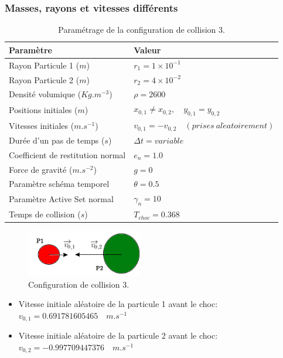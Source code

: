 \subsubsection{Masses, rayons et vitesses différents}
\begin{center}
\begin{table}[!h]
\begin{tabular}{ |p{5.75cm}|p{6.8cm}| }
 \hline \rowcolor{lightgray}
 \hline
 Paramètre& Valeur\\
 \hline
 Rayon Particule 1  ($m$) & $r_1 = 1\times10^{-1}$\\
 Rayon Particule 2 ($m$)  & $r_2 = 4\times10^{-2}$\\
 Densité volumique ($Kg.m^{-3}$)& $\rho = 2600$\\
 Positions initiales ($m$) & $x_{0,1} \neq x_{0,2}, \quad y_{0,1} = y_{0,2}$\\
 Vitesses initiales  ($m.s^{-1}$)  &$v_{0,1} = -v_{0,2} \quad (prises\ al\acute{e}atoirement)$\\
 Durée d'un pas de temps ($s$)&   $\Delta t = variable$\\
 Coefficient de restitution normal& $e_n = 1.0$\\
 Force de gravité ($m.s^{-2}$)& $g = 0$\\
 Paramètre schéma temporel & $\theta = 0.5$\\
 Paramètre Active Set normal &$\gamma_n = 10$\\
 Temps de collision ($s$)& $T_{choc} = 0.368$\\
 \hline
\end{tabular}
\caption{Paramétrage de la configuration de collision 3.}
\end{table}
\end{center}
\vspace{-1.2cm}
\begin{figure}[!h]
  \centering
    \includegraphics[width=0.45\textwidth]{chapitres/chapitre_3/figures/diff-radius_diff-mass_diff-vel.png}
    \caption{Configuration de collision 3.}\label{conf3}
\end{figure}

\begin{itemize}
    \item Vitesse initiale aléatoire de la particule 1 avant le choc:\\ $v_{0,1} = 0.691781605465 \quad m.s^{-1} $ 
    \item Vitesse initiale aléatoire de la particule 2 avant le choc:\\ $v_{0,2} = -0.997709447376 \quad m.s^{-1} $
\end{itemize}

